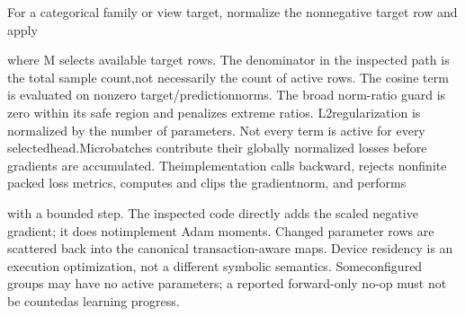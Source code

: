 \noindent
For a categorical family or view target, normalize the nonnegative target row and apply\par


\noindent
where M selects available target rows. The denominator in the inspected path is the total sample count,\linebreak[4]
not necessarily the count of active rows. The cosine term is evaluated on nonzero target/prediction\linebreak[4]
norms. The broad norm-ratio guard is zero within its safe region and penalizes extreme ratios. L2\linebreak[4]
regularization is normalized by the number of parameters. Not every term is active for every selected\linebreak[4]
head.\linebreak[4]
Microbatches contribute their globally normalized losses before gradients are accumulated. The\linebreak[4]
implementation calls backward, rejects nonfinite packed loss metrics, computes and clips the gradient\linebreak[4]
norm, and performs\par


\noindent
with a bounded step. The inspected code directly adds the scaled negative gradient; it does not\linebreak[4]
implement Adam moments. Changed parameter rows are scattered back into the canonical transaction-\linebreak[4]
aware maps. Device residency is an execution optimization, not a different symbolic semantics. Some\linebreak[4]
configured groups may have no active parameters; a reported forward-only no-op must not be counted\linebreak[4]
as learning progress.\par

